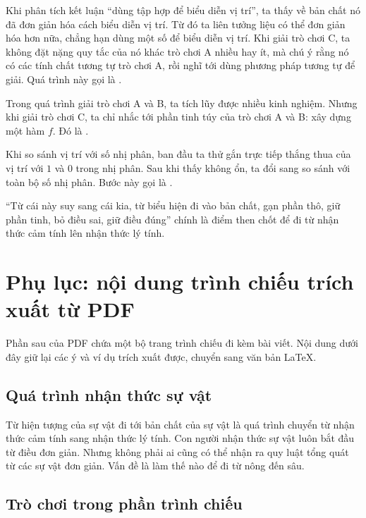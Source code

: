 \documentclass[11pt]{article}
\begin{document}
Khi phân tích kết luận ``dùng tập hợp để biểu diễn vị trí'', ta thấy về bản
chất nó đã đơn giản hóa cách biểu diễn vị trí. Từ đó ta liên tưởng liệu có
thể đơn giản hóa hơn nữa, chẳng hạn dùng một số để biểu diễn vị trí. Khi
giải trò chơi C, ta không đặt nặng quy tắc của nó khác trò chơi A nhiều hay
ít, mà chú ý rằng nó có các tính chất tương tự trò chơi A, rồi nghĩ tới dùng
phương pháp tương tự để giải. Quá trình này gọi là .

Trong quá trình giải trò chơi A và B, ta tích lũy được nhiều kinh nghiệm.
Nhưng khi giải trò chơi C, ta chỉ nhắc tới phần tinh túy của trò chơi A và B:
xây dựng một hàm \(f\). Đó là .

Khi so sánh vị trí với số nhị phân, ban đầu ta thử gắn trực tiếp thắng thua
của vị trí với \(1\) và \(0\) trong nhị phân. Sau khi thấy không ổn, ta đổi
sang so sánh với toàn bộ số nhị phân. Bước này gọi là .

``Từ cái này suy sang cái kia, từ biểu hiện đi vào bản chất, gạn phần thô,
giữ phần tinh, bỏ điều sai, giữ điều đúng'' chính là điểm then chốt để đi từ
nhận thức cảm tính lên nhận thức lý tính.

\appendix

\section{Phụ lục: nội dung trình chiếu trích xuất từ PDF}

Phần sau của PDF chứa một bộ trang trình chiếu đi kèm bài viết. Nội dung
dưới đây giữ lại các ý và ví dụ trích xuất được, chuyển sang văn bản LaTeX.

\subsection{Quá trình nhận thức sự vật}

Từ hiện tượng của sự vật đi tới bản chất của sự vật là quá trình chuyển từ
nhận thức cảm tính sang nhận thức lý tính. Con người nhận thức sự vật luôn
bắt đầu từ điều đơn giản. Nhưng không phải ai cũng có thể nhận ra quy luật
tổng quát từ các sự vật đơn giản. Vấn đề là làm thế nào để đi từ nông đến
sâu.

\subsection{Trò chơi trong phần trình chiếu}
\end{document}
